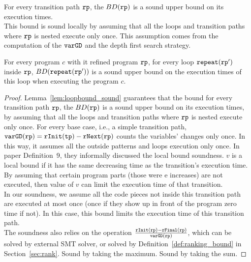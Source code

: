 For every transition path $\mathtt{rp}$, the $BD(\mathtt{rp})$
is a sound upper bound on its execution times.
\\
This bound is sound locally by assuming
that all the loops and transition paths where $\mathtt{rp}$ is nested execute only once.
This assumption comes from the computation of the $\mathtt{varGD}$ and the depth first search strategy.
\\
%
\begin{lemma}
    For every program $c$ with it refined program $\mathtt{rp}$,
    for every loop $\mathtt{repeat}(\mathtt{rp}')$ inside $\mathtt{rp}$, 
    $BD(\mathtt{repeat}(\mathtt{rp}'))$ is a sound upper bound on the execution times of this loop when executing the program $c$.
  \end{lemma}
\begin{proof}
Lemma~\ref{lem:loopbound_sound} guarantees that
the bound for every transition path $\mathtt{rp}$, the $BD(\mathtt{rp})$
is a sound upper bound on its execution times, by assuming
that all the loops and transition paths where $\mathtt{rp}$ is nested execute only once.
For every base case, i.e., a simple transition path, 
$\mathtt{varGD}(\mathtt{rp}) =  \mathtt{rInit}(\mathtt{tp}) - \mathtt{rNext}(\mathtt{rp})$
counts the variables' changes only once. In this way, it assumes all the outside patterns and loops execution only once.
In paper \cite{sinn2017complexity} Definition~9, they informally discussed the local bound soundness.
$v$ is a local bound if it has the same decreasing time as the transition's execution time.
By assuming that certain program parts (those were e increases) are not executed,
then value of $v$ can limit the execution time of that transition.
\\
In our soundness, we assume all the code pieces not inside this transition path are executed at most once (once if they show up in front of the program
zero time if not).
In this case, this bound limits the execution time of this transition path.
\\
The soundness also relies on the operation $\frac{\mathtt{rInit}(\mathtt{rp}) - \mathtt{rFinal}(\mathtt{rp})}{\mathtt{varGD}(\mathtt{rp})}$,
which can be solved by external SMT solver,
or solved by Definition~\ref{def:ranking_bound} in Section~\ref{sec:rank}.
Sound by taking the maximum.
Sound by taking the sum.
\end{proof}